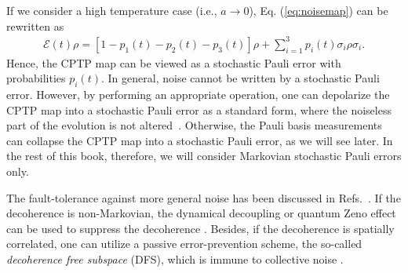 %
If we consider a high temperature case (i.e., $a \rightarrow 0$), Eq. (\ref{eq:noisemap}) can be rewritten as
%
\begin{eqnarray}
\mathcal{E} (t) \rho = \left[1-   p_{1}(t) - p_{2}(t) - p_{3}(t) \right]   \rho  + \sum _{i=1}^{3}  p_{i}(t) \sigma _{i} \rho \sigma _{i}.
\label{StochasticPauli}
 \end{eqnarray}
Hence, the CPTP map can be viewed as a stochastic Pauli error with probabilities $p_{i}(t)$.
In general, noise cannot be written by a stochastic Pauli error.
However, by performing an appropriate operation, one can depolarize the CPTP map into a stochastic Pauli error as a standard form, where the noiseless part of the evolution is not altered~\cite{Dur05}.
Otherwise, the Pauli basis measurements can collapse the CPTP map into a stochastic Pauli error, as we will see later.
In the rest of this book, therefore, we will consider Markovian stochastic Pauli errors only.

The fault-tolerance against more general noise has been discussed in Refs.~\cite{Aharonov97,Aharonov08,Aliferis06,Aliferis08,Aliferis09}.
If the decoherence is non-Markovian, the dynamical decoupling or quantum Zeno effect can be used to suppress the decoherence \cite{Zurek84,Vaidman96,Duan98,Viola98,Viola99,Facchi05}.
Besides, if the decoherence is spatially correlated, one can utilize a passive error-prevention scheme, the so-called {\it decoherence free subspace} (DFS), which is immune to collective noise \cite{Zanardi97,Duan97,Lidar98}.